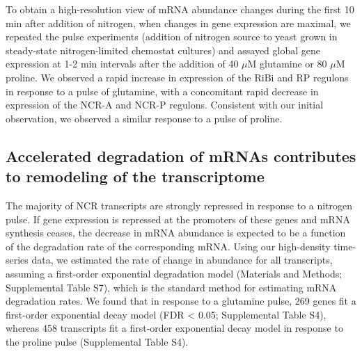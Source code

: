 To obtain a high-resolution view of mRNA abundance
changes during the first 10 min after addition of nitrogen, when
changes in gene expression are maximal, we repeated the
pulse experiments (addition of nitrogen source to yeast grown in
steady-state nitrogen-limited chemostat cultures) and assayed global
gene expression at 1-2 min intervals after the addition of 40 $\mu$M
glutamine or 80 $\mu$M proline. We observed a rapid increase in expression
of the RiBi and RP regulons in response to a pulse of glutamine, with
a concomitant rapid decrease in expression of the NCR-A and NCR-P
regulons. Consistent with our initial observation, we observed a
similar response to a pulse of proline. 

\subsection{Accelerated degradation of
mRNAs contributes to remodeling of the transcriptome }

The majority of
NCR transcripts are strongly repressed in response to a nitrogen
pulse. If gene expression is repressed at the promoters of these genes
and mRNA synthesis ceases, the decrease in mRNA abundance is expected
to be a function of the degradation rate of the corresponding mRNA.
Using our high-density time-series data, we estimated the rate of
change in abundance for all transcripts, assuming a first-order
exponential degradation model (Materials and Methods; Supplemental
Table S7), which is the standard method for estimating mRNA
degradation rates. We found that in response to a glutamine pulse, 269
genes fit a first-order exponential decay model (FDR < 0.05;
Supplemental Table S4), whereas 458 transcripts fit a first-order
exponential decay model in response to the proline pulse (Supplemental
Table S4).  

\newpage


